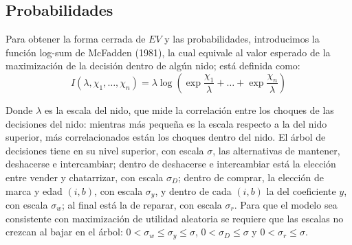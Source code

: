 \documentclass{article}
\begin{document}
\subsection{Probabilidades}

Para obtener la forma cerrada de $EV$ y las probabilidades, introducimos la función log-sum de McFadden (1981), la cual equivale al valor esperado de la maximización de la decisión dentro de algún nido; está definida como:
$$I(\lambda, \chi_1, \dots, \chi_n)=\lambda \log \left(\exp\frac{\chi_1}{\lambda}+\dots+\exp\frac{\chi_n}{\lambda}\right)$$

Donde $\lambda$ es la escala del nido, que mide la correlación entre los choques de las decisiones del nido: mientras más pequeña es la escala respecto a la del nido superior, más correlacionados están los choques dentro del nido. El árbol de decisiones tiene en su nivel superior, con escala $\sigma$, las alternativas de mantener, deshacerse e intercambiar; dentro de deshacerse e intercambiar está la elección entre vender y chatarrizar, con escala $\sigma_D$; dentro de comprar, la elección de marca y edad $(i,b)$, con escala $\sigma_y$, y dentro de cada $(i,b)$ la del coeficiente $y$, con escala $\sigma_w$; al final está la de reparar, con escala $\sigma_r$. Para que el modelo sea consistente con maximización de utilidad aleatoria se requiere que las escalas no crezcan al bajar en el árbol: $0<\sigma_w\le\sigma_y\le\sigma$, $0<\sigma_D\le\sigma$ y $0<\sigma_r\le\sigma$.
\end{document}
